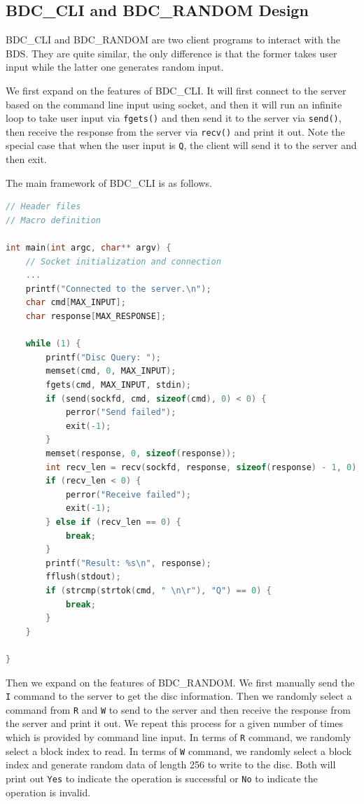 \subsection{BDC\_CLI and BDC\_RANDOM Design}
\label{sec:bdc}
BDC\_CLI and BDC\_RANDOM are two client programs to interact with the BDS. They are quite similar, 
the only difference is that the former takes user input while the latter one generates random input.

We first expand on the features of BDC\_CLI. It will first connect to the server based on 
the command line input using socket, and then it will run an infinite loop to take user input via \texttt{fgets()} and then send it to the server via \texttt{send()}, then receive the response from the server via \texttt{recv()} and print it out.
Note the special case that when the user input is \texttt{Q}, the client will send it to the server and then exit.

The main framework of BDC\_CLI is as follows.

\begin{lstlisting}[language=C]
// Header files
// Macro definition

int main(int argc, char** argv) {
    // Socket initialization and connection
    ...
    printf("Connected to the server.\n");
    char cmd[MAX_INPUT];
    char response[MAX_RESPONSE];

    while (1) {
        printf("Disc Query: ");
        memset(cmd, 0, MAX_INPUT);
        fgets(cmd, MAX_INPUT, stdin);
        if (send(sockfd, cmd, sizeof(cmd), 0) < 0) {
            perror("Send failed");
            exit(-1);
        }
        memset(response, 0, sizeof(response)); 
        int recv_len = recv(sockfd, response, sizeof(response) - 1, 0); 
        if (recv_len < 0) {
            perror("Receive failed");
            exit(-1);
        } else if (recv_len == 0) {
            break;
        }
        printf("Result: %s\n", response);
        fflush(stdout);
        if (strcmp(strtok(cmd, " \n\r"), "Q") == 0) {
            break;
        }
    }

}
\end{lstlisting}

Then we expand on the features of BDC\_RANDOM. We first manually send the \texttt{I} command to the server to get the disc information. Then we randomly select a command from \texttt{R} and \texttt{W}
to send to the server and then receive the response from the server and print it out. We repeat this process for a given number of times which is provided by command line input. In terms of \texttt{R} command, we randomly select a block index to read. In terms of \texttt{W} command, we randomly select a block index and 
generate random data of length 256 to write to the disc. Both will print out \texttt{Yes} to indicate the operation is successful or \texttt{No} to indicate the operation is invalid.

